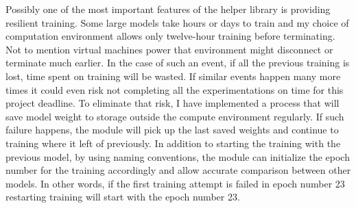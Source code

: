 Possibly one of the most important features of the helper library is providing resilient training. 
Some large models take hours or days to train and my choice of computation environment allows only twelve-hour training before terminating. 
Not to mention virtual machines power that environment might disconnect or terminate much earlier. 
In the case of such an event, if all the previous training is lost, time spent on training will be wasted. 
If similar events happen many more times it could even risk not completing all the experimentations on time for this project deadline. 
To eliminate that risk, I have implemented a process that will save model weight to storage outside the compute environment regularly. 
If such failure happens, the module will pick up the last saved weights and continue to training where it left of previously.
In addition to starting the training with the previous model, by using naming conventions, the module can initialize the epoch number for the training accordingly and allow accurate comparison between other models. 
In other words, if the first training attempt is failed in epoch number 23 restarting training will start with the epoch number 23.

\clearpage